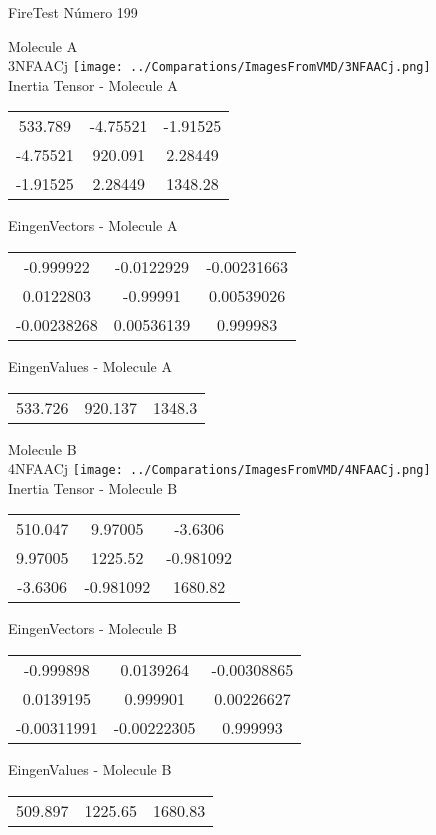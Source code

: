 \vtab[-2cm]
\begin{center}
{\large FireTest \tab Número 199}
\end{center}
\begin{multicols}{2}
\begin{center}

Molecule A \\ 
3NFAACj
\texttt{[image: ../Comparations/ImagesFromVMD/3NFAACj.png]}
\\
Inertia Tensor - Molecule A \\
\vtab

\begin{tabular}{|c c c|}
533.789	 & 	-4.75521	 & 	-1.91525	 \\
-4.75521	 & 	920.091	 & 	2.28449	 \\
-1.91525	 & 	2.28449	 & 	1348.28
\end{tabular}

\vtab
 EingenVectors - Molecule A     \\
\vtab
\begin{tabular}{|c c c|}
-0.999922	 & 	-0.0122929	 & 	-0.00231663	 \\
0.0122803	 & 	-0.99991	 & 	0.00539026	 \\
-0.00238268	 & 	0.00536139	 & 	0.999983
\end{tabular}

\vtab
 EingenValues - Molecule A     \\
\vtab
\begin{tabular}{|c c c|}
533.726	 & 	920.137	 & 	1348.3	 \\
\end{tabular}
\columnbreak

Molecule B \\ 
4NFAACj
\texttt{[image: ../Comparations/ImagesFromVMD/4NFAACj.png]}
\\
Inertia Tensor - Molecule B \\
\vtab

\begin{tabular}{|c c c|}
510.047	 & 	9.97005	 & 	-3.6306	 \\
9.97005	 & 	1225.52	 & 	-0.981092	 \\
-3.6306	 & 	-0.981092	 & 	1680.82
\end{tabular}

\vtab
 EingenVectors - Molecule B     \\
\vtab
\begin{tabular}{|c c c|}
-0.999898	 & 	0.0139264	 & 	-0.00308865	 \\
0.0139195	 & 	0.999901	 & 	0.00226627	 \\
-0.00311991	 & 	-0.00222305	 & 	0.999993
\end{tabular}

\vtab
 EingenValues - Molecule B     \\
\vtab
\begin{tabular}{|c c c|}
509.897	 & 	1225.65	 & 	1680.83	 \\
\end{tabular}

\end{center}
\end{multicols}

